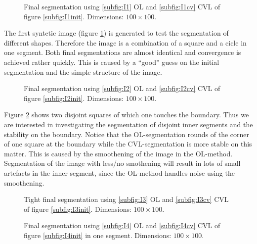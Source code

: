 \begin{figure}[h]
  \centering
  \caption{Final segmentation using \ref{subfig:I1} OL and \ref{subfig:I1cv} CVL of figure \ref{subfig:I1init}. Dimensions: $100\times 100$.}\label{I1}
\end{figure}

The first syntetic image (figure \ref{I1}) is generated to test the segmentation of different shapes. Therefore the image is a combination of a square and a cicle in one segment. Both final segmentations are almost identical and convergence is achieved rather quickly. This is caused by a ``good'' guess on the initial segmentation and the simple structure of the image.\\

\begin{figure}[h]
  \centering
  \caption{Final segmentation using \ref{subfig:I2} OL and \ref{subfig:I2cv} CVL of figure \ref{subfig:I2init}. Dimensions: $100\times 100$.}\label{I2}
\end{figure}

Figure \ref{I2} shows two disjoint squares of which one touches the boundary. Thus we are interested in investigating the segmentation of disjoint inner segments and the stability on the boundary. Notice that the OL-segmentation rounds of the corner of one square at the boundary while the CVL-segmentation is more stable on this matter. This is caused by the smoothening of the image in the OL-method. Segmentation of the image with less/no smothening will result in lots of small artefacts in the inner segment, since the OL-method handles noise using the smoothening.\\

\begin{figure}[h]
  \centering
  \caption{Tight final segmentation using \ref{subfig:I3} OL and \ref{subfig:I3cv} CVL of figure \ref{subfig:I3init}. Dimensions: $100\times 100$.}\label{I3}
\end{figure}
\begin{figure}[h]
  \centering
  \caption{Final segmentation using \ref{subfig:I4} OL and \ref{subfig:I4cv} CVL of figure \ref{subfig:I4init} in one segment. Dimensions: $100\times 100$.}\label{I4}
\end{figure}


